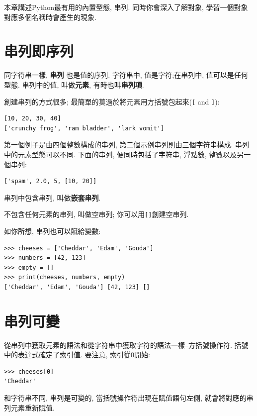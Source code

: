 \documentclass[10pt]{book}
\begin{document}
本章講述Python最有用的內置型態, 串列. 
同時你會深入了解對象, 學習一個對象對應多個名稱時會產生的現象. 


\section{串列即序列}
\label{sequence}

同字符串一樣, {\bf 串列} 也是值的序列. 
字符串中, 值是字符;在串列中, 值可以是任何型態. 
串列中的值, 叫做{\bf 元素}, 有時也叫{\bf 串列項}.

創建串列的方式很多; 最簡單的莫過於將元素用方括號包起來(\verb"[" and \verb"]"):

\begin{verbatim}
[10, 20, 30, 40]
['crunchy frog', 'ram bladder', 'lark vomit']
\end{verbatim}
%
第一個例子是由四個整數構成的串列, 
第二個示例串列則由三個字符串構成. 
串列中的元素型態可以不同. 
下面的串列, 便同時包括了字符串, 浮點數, 整數以及另一個串列:

\begin{verbatim}
['spam', 2.0, 5, [10, 20]]
\end{verbatim}
%
串列中包含串列, 叫做{\bf 嵌套串列}.

不包含任何元素的串列, 叫做空串列;
你可以用\verb"[]"創建空串列.

如你所想, 串列也可以賦給變數:

\begin{verbatim}
>>> cheeses = ['Cheddar', 'Edam', 'Gouda']
>>> numbers = [42, 123]
>>> empty = []
>>> print(cheeses, numbers, empty)
['Cheddar', 'Edam', 'Gouda'] [42, 123] []
\end{verbatim}
%


\section{串列可變}
\label{mutable}

從串列中獲取元素的語法和從字符串中獲取字符的語法一樣--方括號操作符. 
括號中的表達式確定了索引值. 
要注意, 索引從0開始:

\begin{verbatim}
>>> cheeses[0]
'Cheddar'
\end{verbatim}
%
和字符串不同, 串列是可變的, 當括號操作符出現在賦值語句左側, 
就會將對應的串列元素重新賦值. 
\end{document}

